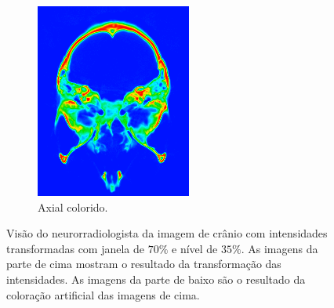 \documentclass{article}
\begin{document}
\begin{figure}[H]
\begin{subfigure}[b]{0.3\textwidth}
        \includegraphics[width=\textwidth]{skull/neuroradiologist-axial.png}
        \caption{Axial colorido.}
    \end{subfigure}
    \caption{Visão do neurorradiologista da imagem de crânio com intensidades transformadas com janela de $70\%$ e nível de $35\%$. As imagens da parte de cima mostram o resultado da transformação das intensidades. As imagens da parte de baixo são o resultado da coloração artificial das imagens de cima.}
    \label{fig:skull-visao-neurorradiologista-cores}
\end{figure}
\end{document}
